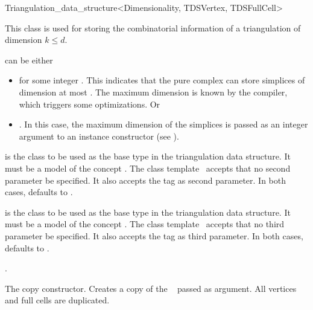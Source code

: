 \begin{ccRefClass}{Triangulation_data_structure<Dimensionality, TDSVertex, TDSFullCell>}

\ccDefinition 
This class is used for storing the combinatorial information of a triangulation
of dimension $k\leq d$.


\ccParameters

 can be either \begin{itemize}

\item \ccPureGlobalScope{} for some integer . This
indicates that the pure complex can store simplices of dimension at most
. The maximum dimension  is known by the compiler, which
triggers some optimizations. Or

\item \ccPureGlobalScope{}. In this case, the maximum
dimension of the simplices is passed as an integer argument to an instance
constructor (see ).\end{itemize}

 is the class to be used as the base  type in the
triangulation data structure. It must be a model of the concept
. The class template \ccRefName\ accepts that no
second parameter be specified. It also accepts the tag  as
second parameter. In both cases,  defaults to
.


 is the class to be used as the base  type in
the triangulation data structure. It must be a model of the concept
. The class template \ccRefName\ accepts that no
third parameter be specified. It also accepts the tag  as
third parameter. In both cases,  defaults to
.

\ccIsModel

.

\ccCreation
{}

{The copy constructor. Creates a copy of the \ccRefName\  passed as
    argument. All vertices and full cells are duplicated.}

\begin{ccAdvanced}


\end{ccAdvanced}
\end{ccRefClass}
